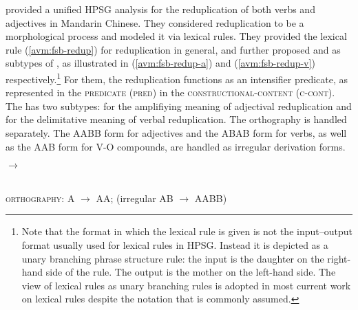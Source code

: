  
 
 
 
 
 
\citet*{FanSongBond2015} provided a unified HPSG analysis for the reduplication of both verbs and adjectives in Mandarin Chinese.
They considered reduplication to be a morphological process and modeled it via lexical rules.
They provided the lexical rule (\ref{avm:fsb-redup}) for reduplication in general,
and further proposed  and  as subtypes of , 
as illustrated in (\ref{avm:fsb-redup-a}) and (\ref{avm:fsb-redup-v}) respectively.\footnote{%
  Note that the format in which the lexical rule is given is not the input--output format usually
  used for lexical rules in HPSG. Instead it is depicted as a unary branching phrase structure
  rule: the input is the daughter on the right-hand side of the rule. The output is the mother on
  the left-hand side. The view of lexical rules as unary branching rules is adopted in most current work on
  lexical rules \citep{BC99a,Meurers2001a} despite the notation that is commonly assumed.  
}
For them, the reduplication functions as an intensifier predicate, as represented in the \textsc{predicate (pred)} in the \textsc{constructional-content (c-cont)}.
The  has two subtypes:  for the amplifiying meaning of adjectival reduplication and  for the delimitative meaning of verbal reduplication.
The orthography is handled separately.
The AABB form for adjectives and the ABAB form for verbs, as well as the AAB form for V-O compounds, are handled as irregular derivation forms.


\ea\label{avm:fsb-redup}
$\to$
\z


\ea\label{avm:fsb-redup-a}
\\
\textsc{orthography}: A $\to$ AA; (irregular AB $\to$ AABB)
\z

